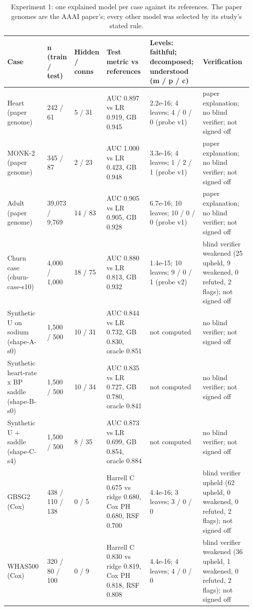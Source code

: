 \begin{table}[htbp]
\centering
\small
\caption{Experiment 1: one explained model per case against its references. The paper genomes are the AAAI paper's; every other model was selected by its study's stated rule.}
\label{tab:ch7-exp1-cases}
\begin{tabular}{p{3.2cm}p{1.6cm}p{1.4cm}p{3.6cm}p{3.6cm}p{3.2cm}}
\toprule
Case & n (train / test) & Hidden / conns & Test metric vs references & Levels: faithful; decomposed; understood (m / p / c) & Verification \\
\midrule
Heart (paper genome) & 242 / 61 & 5 / 31 & AUC 0.897 vs LR 0.919, GB 0.945 & 2.2e-16; 4 leaves; 4 / 0 / 0 (probe v1) & paper explanation; no blind verifier; not signed off \\
MONK-2 (paper genome) & 345 / 87 & 2 / 23 & AUC 1.000 vs LR 0.423, GB 0.948 & 3.3e-16; 4 leaves; 1 / 2 / 1 (probe v1) & paper explanation; no blind verifier; not signed off \\
Adult (paper genome) & 39,073 / 9,769 & 14 / 83 & AUC 0.905 vs LR 0.905, GB 0.928 & 6.7e-16; 10 leaves; 10 / 0 / 0 (probe v1) & paper explanation; no blind verifier; not signed off \\
Churn case (churn-case-s10) & 4,000 / 1,000 & 18 / 75 & AUC 0.880 vs LR 0.813, GB 0.932 & 1.4e-15; 10 leaves; 9 / 0 / 1 (probe v2) & blind verifier weakened (25 upheld, 9 weakened, 0 refuted, 2 flags); not signed off \\
Synthetic U on sodium (shape-A-s0) & 1,500 / 500 & 10 / 31 & AUC 0.844 vs LR 0.732, GB 0.830, oracle 0.851 & not computed & no blind verifier; not signed off \\
Synthetic heart-rate x BP saddle (shape-B-s0) & 1,500 / 500 & 10 / 34 & AUC 0.835 vs LR 0.727, GB 0.780, oracle 0.841 & not computed & no blind verifier; not signed off \\
Synthetic U + saddle (shape-C-s4) & 1,500 / 500 & 8 / 35 & AUC 0.873 vs LR 0.699, GB 0.854, oracle 0.884 & not computed & no blind verifier; not signed off \\
\midrule
GBSG2 (Cox) & 438 / 110 / 138 & 0 / 5 & Harrell C 0.675 vs ridge 0.680, Cox PH 0.680, RSF 0.700 & 4.4e-16; 3 leaves; 3 / 0 / 0 & blind verifier upheld (62 upheld, 0 weakened, 0 refuted, 2 flags); not signed off \\
WHAS500 (Cox) & 320 / 80 / 100 & 0 / 9 & Harrell C 0.830 vs ridge 0.819, Cox PH 0.818, RSF 0.808 & 4.4e-16; 4 leaves; 4 / 0 / 0 & blind verifier weakened (36 upheld, 1 weakened, 0 refuted, 2 flags); not signed off \\

\end{tabular}
\end{table}

